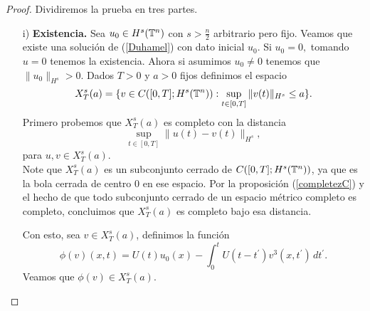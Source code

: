 \begin{proof}
Dividiremos la prueba en tres partes.
\begin{itemize}
       \item[i)]\textbf{Existencia.} Sea $u_0\in H^s(\mathbb{T}^n)$ con $s>\frac{n}{2}$ arbitrario pero fijo. Veamos que existe una solución de (\ref{Duhamel}) con dato inicial $u_0.$ Si $u_0=0,$ tomando $u=0$ tenemos la existencia. Ahora si asumimos $u_0\neq 0$ tenemos que $\|u_0\|_{H^s}>0.$ Dados $T>0$ y $a>0$ fijos definimos el espacio
       $$X_T^s(a)=\{v\in C([0,T];H^s(\mathbb{T}^n)):\sup_{t\in[0,T]}\|v(t)\|_{H^s}\leq a\}.$$
       Primero probemos que $X_T^s(a)$ es completo con la distancia
       $$\sup_{t\in[0,T]}\|u(t)-v(t)\|_{H^s},$$
       para $u,v\in X^s_T(a)$.\\

       Note que $X^s_T(a)$ es un subconjunto cerrado de $C([0,T];H^s(\mathbb{T}^n))$, ya que es la bola cerrada de centro $0$ en ese espacio. Por la proposición (\ref{completezC}) y el hecho de que todo subconjunto cerrado de un espacio métrico completo es completo, concluimos que $X^s_T(a)$ es completo bajo esa distancia.

       Con esto, sea $v\in X^s_T(a)$, definimos la función
       $$\phi(v)(x,t)=U(t)u_0(x)-\int_0^tU(t-t^\prime)v^3(x,t^\prime)\,dt^\prime.$$
       Veamos que $\phi(v)\in X^s_T(a).$ 


\end{itemize}
\end{proof}
